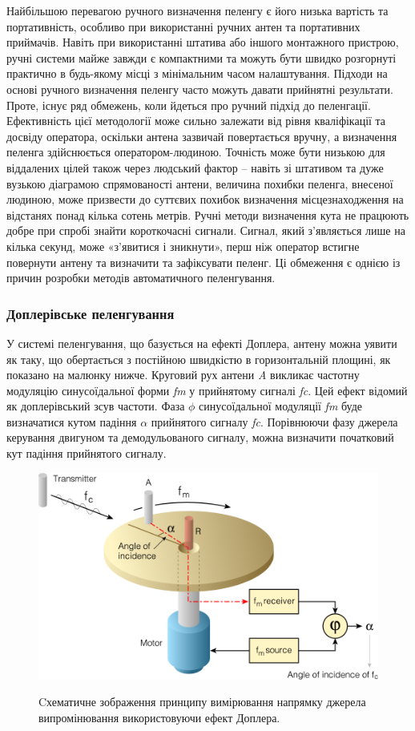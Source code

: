 \documentclass{article}
\begin{document}
Найбільшою перевагою ручного визначення пеленгу є його низька вартість та портативність, особливо при використанні ручних антен та портативних приймачів. Навіть при використанні штатива або іншого монтажного пристрою, ручні системи майже завжди є компактними та можуть бути швидко розгорнуті практично в будь-якому місці з мінімальним часом налаштування. Підходи на основі ручного визначення пеленгу часто можуть давати прийнятні результати. Проте, існує ряд обмежень, коли йдеться про ручний підхід до пеленгації. Ефективність цієї методології може сильно залежати від рівня кваліфікації та досвіду оператора, оскільки антена зазвичай повертається вручну, а визначення пеленга здійснюється оператором-людиною. Точність може бути низькою для віддалених цілей також через людський фактор – навіть зі штативом та дуже вузькою діаграмою спрямованості антени, величина похибки пеленга, внесеної людиною, може призвести до суттєвих похибок визначення місцезнаходження на відстанях понад кілька сотень метрів. Ручні методи визначення кута не працюють добре при спробі знайти короткочасні сигнали. Сигнал, який з'являється лише на кілька секунд, може «з'явитися і зникнути», перш ніж оператор встигне повернути антену та визначити та зафіксувати пеленг. Ці обмеження є однією із причин розробки методів автоматичного пеленгування.

\subsubsection{Доплерівське пеленгування}
У системі пеленгування, що базується на ефекті Доплера, антену можна уявити як таку, що обертається з постійною швидкістю в горизонтальній площині, як показано на малюнку нижче. Круговий рух антени \textit{A} викликає частотну модуляцію синусоїдальної форми \textit{fm} у прийнятому сигналі \textit{fc}. Цей ефект відомий як доплерівський зсув частоти. Фаза $\phi$ синусоїдальної модуляції \textit{fm} буде визначатися кутом падіння $\alpha$ прийнятого сигналу \textit{fc}. Порівнюючи фазу джерела керування двигуном та демодульованого сигналу, можна визначити початковий кут падіння прийнятого сигналу.

\begin{figure}[H]
\centering
{\includegraphics[width=0.6\linewidth]{images/rdf-dopler.png}}
\caption{\label{fig:rdf:dopler}Cхематичне зображення принципу вимірювання напрямку джерела випромінювання використовуючи ефект Доплера.}
\end{figure}
\end{document}
